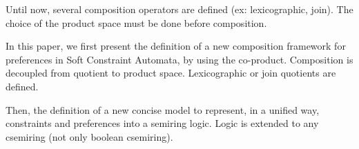 Until now, several composition operators are defined (ex: lexicographic, join). The choice of the product space must be done before composition.

In this paper, we first present the definition of a new composition framework for preferences in Soft Constraint Automata, by using the co-product. Composition is decoupled from quotient to product space. Lexicographic or join quotients are defined.

Then, the definition of a new concise model to represent, in a unified way, constraints and preferences into a semiring logic. Logic is extended to any csemiring (not only boolean csemiring). 



